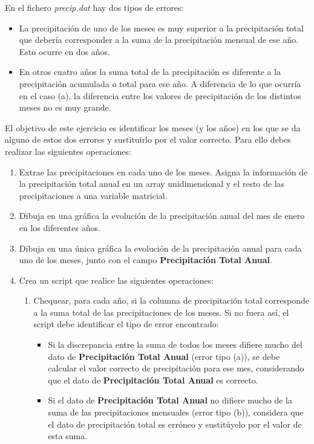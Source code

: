 \begin{enumerate}
En el fichero \textit{precip.dat} hay dos tipos de errores:
\begin{itemize}
    \item La precipitación de uno de los meses es muy superior a la precipitación total que debería corresponder a la suma de la precipitación mensual de ese año. Esto ocurre en dos años.
    \item En otros cuatro años la suma total de la precipitación es diferente a la precipitación
acumulada o total para ese año. A diferencia de lo que ocurría en el caso (a), la diferencia
entre los valores de precipitación de los distintos meses no es muy grande. 
\end{itemize}
El objetivo de este ejercicio es identificar los meses (y los años) en los que se da alguno de
estos dos errores y sustituirlo por el valor correcto. Para ello debes realizar las siguientes
operaciones:
\begin{enumerate}
    \item Extrae las precipitaciones en cada uno de los meses. Asigna la información de la precipitación total anual en un array unidimensional y el resto de las
precipitaciones a una variable matricial.
    \item Dibuja en una gráfica la evolución de la precipitación anual del mes de enero en los
diferentes años.
    \item Dibuja en una única gráfica la evolución de la precipitación anual para cada uno de los meses, junto con el campo \textbf{Precipitación Total Anual}.
    \item Crea un script que realice las siguientes operaciones:
    \begin{enumerate}
        \item Chequear, para cada año, si la columna de precipitación total corresponde a la suma total de las precipitaciones de los meses. Si no fuera así, el script debe identificar el tipo de error encontrado:
        \begin{itemize}
            \item Si la discrepancia entre la suma de todos los meses difiere mucho del dato de
\textbf{Precipitación Total Anual} (error tipo (a)), se debe calcular el valor correcto de
precipitación para ese mes, considerando que el dato de \textbf{Precipitación Total Anual}
es correcto.
            \item Si el dato de \textbf{Precipitación Total Anual} no difiere mucho de la suma de las precipitaciones mensuales (error tipo (b)), considera que el dato de precipitación total es erróneo y sustitúyelo por el valor de esta suma.


\end{itemize}
\end{enumerate}
\end{enumerate}
\end{enumerate}

